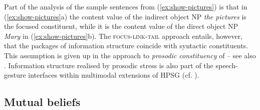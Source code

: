 \documentclass[output=paper]{langsci/langscibook}
\begin{document}
Part of the analysis of the sample sentences from (\ref{ex:show-pictures}) is that in (\ref{ex:show-pictures}a) the content value of the indirect object NP \textit{the pictures} is the focused constituent, while it is the content value of the direct object NP \textit{Mary} in (\ref{ex:show-pictures}b).
%
The \textsc{focus-link-tail} approach entails, however, that the packages of information structure coincide with syntactic constituents.
 
%
This assumption is given up in the approach to \emph{prosodic constituency}  of \citet{Klein:2000} -- see also .
%
Information structure realised by prosodic stress is also part of the speech-gesture interfaces within multimodal extensions of HPSG (cf. ).
  



\subsection{Mutual beliefs}
\label{sec:mutual-beliefs}
\end{document}

